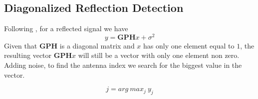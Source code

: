 \subsection{Diagonalized Reflection Detection}
Following \cite{9328149}, for a reflected signal we have
\begin{equation}
  y = \bm{GPH}x + \sigma^2
\end{equation}
Given that $\bm{GPH}$ is a diagonal matrix and $x$ has only one element equal to $1$, the resulting vector $\bm{GPH}x$ will still be a vector with only one element non zero. Adding noise, to find the antenna index we search for the biggest value in the vector.

\begin{equation}
  j = arg\ max_j\ y_j
  \label{eq:reflection_detection}
\end{equation}